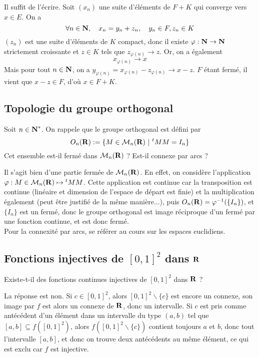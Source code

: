 \begin{correction}
	Il suffit de l'écrire. Soit $(x_n)$ une suite d'éléments de $F+K$ qui converge vers $x\in E$. On a \[\forall n\in\operatorname{\mathbf{N}},\quad x_n=y_n+z_n,\quad y_n\in F,z_n\in K\]
	$(z_n)$ est une suite d'éléments de $K$ compact, donc il existe $\varphi :\operatorname{\mathbf{N}}\to \operatorname{\mathbf{N}}$ strictement croissante et $z\in K$ tels que $z_{\varphi(n)}\longrightarrow z$. Or, on a également \[x_{\varphi(n)}\longrightarrow x\]
	Mais pour tout $n\in\operatorname{\mathbf{N}}$, on a $y_{\varphi(n)}=x_{\varphi(n)}-z_{\varphi(n)}\longrightarrow x-z$. $F$ étant fermé, il vient que $x-z\in F$, d'où $x\in F+K$.
\end{correction}

\subsection{Topologie du groupe orthogonal}
\begin{exercice}
	Soit $n\in\operatorname{\mathbf{N}}^*$. On rappele que le groupe orthogonal est défini par \[O_n(\R):=\lbrace M\in\mathcal M_n(\R)\ |\ {}^tMM=I_n\rbrace\]
	Cet ensemble est-il fermé dans $\mathcal M_n(\operatorname{\mathbf{R}})$ ? Est-il connexe par arcs ?
\end{exercice}

\begin{correction}
	Il s'agit bien d'une partie fermée de $\mathcal M_n(\operatorname{\mathbf{R}})$. En effet, on considère l'application $\varphi : M\in\mathcal M_n(\operatorname{\mathbf{R}})\mapsto {}^tMM$. Cette application est continue car la transposition est continue (linéaire et dimension de l'espace de départ est finie) et la multiplication également (peut être justifié de la même manière...), puis $O_n(\operatorname{\mathbf{R}})=\varphi^{-1}(\lbrace I_n\rbrace)$, et $\lbrace I_n\rbrace$ est un fermé, donc le groupe orthogonal est image réciproque d'un fermé par une fonction continue, et est donc fermé.\\
	Pour la connexité par arcs, se référer au cours sur les espaces euclidiens.
\end{correction}

\subsection{Fonctions injectives de $[0,1]^2$ dans $\operatorname{\mathbf{R}}$}
\begin{exercice}
    Existe-t-il des fonctions continues injectives de $[0,1]^2$ dans $\operatorname{\mathbf{R}}$ ?
\end{exercice}

\begin{correction}
    La réponse est non.
    Si $c\in[0,1]^2$, alors $[0,1]^2\backslash\lbrace c\rbrace$ est encore un connexe,
    son image par $f$ est alors un connexe de $\operatorname{\mathbf{R}}$, donc un intervalle. 
    Si $c$ est pris comme antécédent d'un élément dans un intervalle du type $(a,b)$ tel que $[a,b]\subseteq f([0,1]^2)$,
    alors $f([0,1]^2\backslash\lbrace c\rbrace)$ contient toujours $a$ et $b$, donc tout l'intervalle $[a,b]$, et donc on trouve deux antécédents au même élément,
    ce qui est exclu car $f$ est injective.
\end{correction}